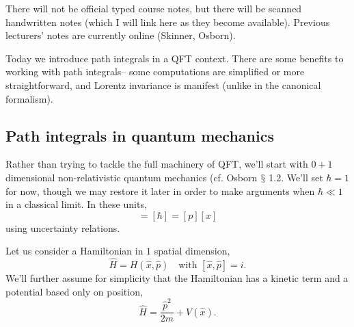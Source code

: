 \begin{note}
There will not be official typed course notes, but there will be scanned handwritten notes (which I will link here as they become available). Previous lecturers' notes are currently online (Skinner, Osborn).
\end{note}

Today we introduce path integrals in a QFT context. There are some benefits to working with path integrals-- some computations are simplified or more straightforward, and Lorentz invariance is manifest (unlike in the canonical formalism).

\subsection*{Path integrals in quantum mechanics} Rather than trying to tackle the full machinery of QFT, we'll start with $0+1$ dimensional non-relativistic quantum mechanics (cf. Osborn $\mathsection$ 1.2. We'll set $\hbar = 1$ for now, though we may restore it later in order to make arguments when $\hbar \ll 1$ in a classical limit. In these units,
\begin{equation*}
    [E][t]=[\hbar]=[p][x]
\end{equation*}
using uncertainty relations.

Let us consider a Hamiltonian in $1$ spatial dimension,
\begin{equation*}
    \hat H=H(\hat x, \hat p)\quad \text{with }[\hat x,\hat p]=i.
\end{equation*}
We'll further assume for simplicity that the Hamiltonian has a kinetic term and a potential based only on position,
\begin{equation*}
    \hat H= \frac{\hat p^2}{2m}+V(\hat x).
\end{equation*}

